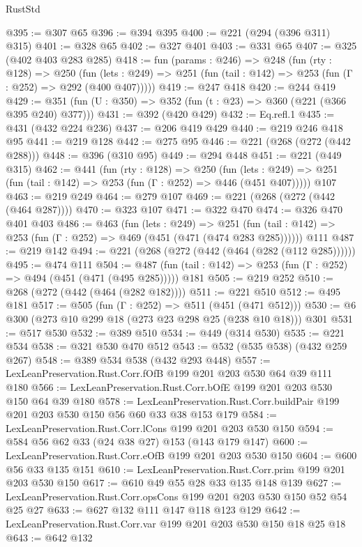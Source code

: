 \begin{lexlean}{RustStd}
\begin{coremodule}
{\begin{coremodule}
{{{{{@395 := @307 @65
@396 := @394 @395
@400 := @221 (@294 (@396 @311) @315)
@401 := @328 @65
@402 := @327 @401
@403 := @331 @65
@407 := @325 (@402 @403 @283 @285)
@418 := fun (params : @246) =>
  @248
    (fun (rty : @128) =>
    @250
      (fun (lets : @249) => @251 (fun (tail : @142) => @253 (fun (Γ : @252) => @292 (@400 @407)))))
@419 := @247 @418
@420 := @244 @419
@429 := @351 (fun (U : @350) => @352 (fun (t : @23) => @360 (@221 (@366 @395 @240) @377)))
@431 := @392 (@420 @429)
@432 := Eq.refl.{1}
@435 := @431 (@432 @224 @236)
@437 := @206 @419 @429
@440 := @219 @246 @418 @95
@441 := @219 @128
@442 := @275 @95
@446 := @221 (@268 (@272 (@442 @288)))
@448 := @396 (@310 @95)
@449 := @294 @448
@451 := @221 (@449 @315)
@462 := @441
    (fun (rty : @128) =>
    @250
      (fun (lets : @249) => @251 (fun (tail : @142) => @253 (fun (Γ : @252) => @446 (@451 @407)))))
    @107
@463 := @219 @249
@464 := @279 @107
@469 := @221 (@268 (@272 (@442 (@464 @287))))
@470 := @323 @107
@471 := @322 @470
@474 := @326 @470 @401 @403
@486 := @463
    (fun (lets : @249) =>
    @251 (fun (tail : @142) => @253 (fun (Γ : @252) => @469 (@451 (@471 (@474 @283 @285))))))
    @111
@487 := @219 @142
@494 := @221 (@268 (@272 (@442 (@464 (@282 (@112 @285))))))
@495 := @474 @111
@504 := @487 (fun (tail : @142) => @253 (fun (Γ : @252) => @494 (@451 (@471 (@495 @285))))) @181
@505 := @219 @252
@510 := @268 (@272 (@442 (@464 (@282 @182))))
@511 := @221 @510
@512 := @495 @181
@517 := @505 (fun (Γ : @252) => @511 (@451 (@471 @512)))
@530 := @6 @300 (@273 @10 @299 @18 (@273 @23 @298 @25 (@238 @10 @18))) @301
@531 := @517 @530
@532 := @389 @510
@534 := @449 (@314 @530)
@535 := @221 @534
@538 := @321 @530 @470 @512
@543 := @532 (@535 @538) (@432 @259 @267)
@548 := @389 @534 @538 (@432 @293 @448)
@557 := LexLeanPreservation.Rust.Corr.fOfB @199 @201 @203 @530 @64 @39 @111 @180
@566 := LexLeanPreservation.Rust.Corr.bOfE @199 @201 @203 @530 @150 @64 @39 @180
@578 := LexLeanPreservation.Rust.Corr.buildPair @199 @201 @203 @530 @150 @56 @60 @33 @38 @153 @179
@584 := LexLeanPreservation.Rust.Corr.lCons @199 @201 @203 @530 @150
@594 := @584 @56 @62 @33 (@24 @38 @27) @153 (@143 @179 @147)
@600 := LexLeanPreservation.Rust.Corr.eOfB @199 @201 @203 @530 @150
@604 := @600 @56 @33 @135 @151
@610 := LexLeanPreservation.Rust.Corr.prim @199 @201 @203 @530 @150
@617 := @610 @49 @55 @28 @33 @135 @148 @139
@627 := LexLeanPreservation.Rust.Corr.opsCons @199 @201 @203 @530 @150 @52 @54 @25 @27
@633 := @627 @132 @111 @147 @118 @123 @129
@642 := LexLeanPreservation.Rust.Corr.var @199 @201 @203 @530 @150 @18 @25 @18
@643 := @642 @132
}}}}}
\end{coremodule}}
\end{coremodule}
\end{lexlean}
